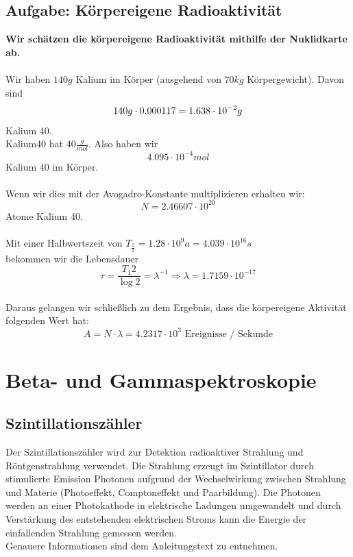 \documentclass{article}
\begin{document}
\subsection{Aufgabe: Körpereigene Radioaktivität}
\textbf{Wir schätzen die körpereigene Radioaktivität mithilfe der Nuklidkarte ab.}\\
\\
Wir haben $140g$ Kalium im Körper (ausgehend von $70kg$ Körpergewicht).
Davon sind
$$
140g\cdot 0.000117=1.638\cdot10^{-2}g \\
$$
Kalium 40.\\
Kalium40 hat $40\frac{g}{mol}$. Also haben wir \\
$$4.095\cdot10^{-4}mol$$ Kalium 40 im Körper.\\
\\
Wenn wir dies mit der Avogadro-Konstante multiplizieren erhalten wir:\\
$$N=2.46607\cdot 10^{20}$$ Atome Kalium 40.\\
\\
Mit einer Halbwertszeit von $T_{\frac{1}{2}}= 1.28 \cdot 10^{9}a=4.039\cdot 10^{16}s$ \\
bekommen wir die Lebensdauer $$\tau=\frac{T_{1}{2}}{\log{2}}=\lambda^{-1} \Rightarrow \lambda=1.7159 \cdot 10^{-17}$$
\\
Daraus gelangen wir schließlich zu dem Ergebnis, dass die körpereigene Aktivität folgenden Wert hat:
$$\boxed{A=N\cdot \lambda = 4.2317\cdot 10^{3} \textrm{ Ereignisse / Sekunde}}$$

\newpage
\section{Beta- und Gammaspektroskopie}

\subsection{Szintillationszähler}
Der Szintillationszähler wird zur Detektion radioaktiver Strahlung und Röntgenstrahlung verwendet. Die Strahlung erzeugt im Szintillator durch stimulierte Emission Photonen aufgrund der Wechselwirkung zwischen Strahlung und Materie (Photoeffekt, Comptoneffekt und Paarbildung). Die Photonen werden an einer Photokathode in elektrische Ladungen umgewandelt und durch Verstärkung des entstehenden elektrischen Stroms kann die Energie der einfallenden Strahlung gemessen werden.\\
Genauere Informationen sind dem Anleitungstext zu entnehmen.
\end{document}
